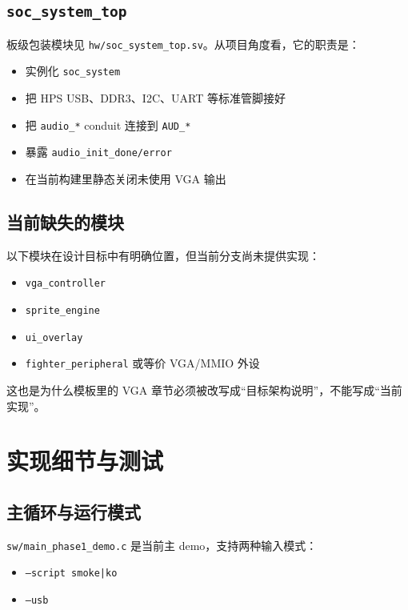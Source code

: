 \documentclass[12pt,a4paper]{ctexart}
\begin{document}
\subsection{\texttt{soc\_system\_top}}

板级包装模块见 \texttt{hw/soc\_system\_top.sv}。从项目角度看，它的职责是：

\begin{itemize}
  \item 实例化 \texttt{soc\_system}
  \item 把 HPS USB、DDR3、I2C、UART 等标准管脚接好
  \item 把 \texttt{audio\_*} conduit 连接到 \texttt{AUD\_*}
  \item 暴露 \texttt{audio\_init\_done/error}
  \item 在当前构建里静态关闭未使用 VGA 输出
\end{itemize}

\subsection{当前缺失的模块}

以下模块在设计目标中有明确位置，但当前分支尚未提供实现：

\begin{itemize}
  \item \texttt{vga\_controller}
  \item \texttt{sprite\_engine}
  \item \texttt{ui\_overlay}
  \item \texttt{fighter\_peripheral} 或等价 VGA/MMIO 外设
\end{itemize}

这也是为什么模板里的 VGA 章节必须被改写成“目标架构说明”，不能写成“当前实现”。

\section{实现细节与测试}

\subsection{主循环与运行模式}

\texttt{sw/main\_phase1\_demo.c} 是当前主 demo，支持两种输入模式：

\begin{itemize}
  \item \texttt{--script smoke|ko}
  \item \texttt{--usb}
\end{itemize}
\end{document}
